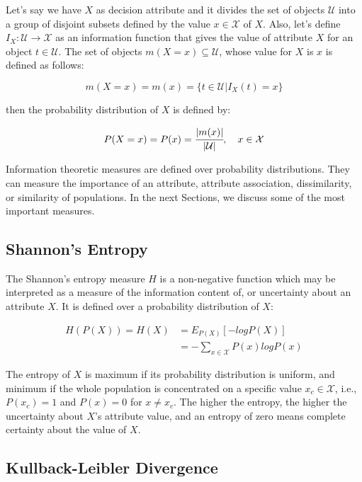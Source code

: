 Let's say we have $X$ as decision attribute and it divides the set of objects $\mathcal{U}$ into a group of disjoint
subsets defined by the value $x \in \mathcal{X}$ of $X$. Also, let's define $I_X : \mathcal{U} \rightarrow \mathcal{X}$
as an information function that gives the value of
attribute $X$ for an object $t \in \mathcal{U}$. The set of objects $m(X=x) \subseteq \mathcal{U}$, whose value for
$X$
is $x$ is defined as follows:

\begin{equation}
 m(X=x)=m(x)=\{t \in \mathcal{U} | I_X(t)=x\}
\end{equation}

then the probability distribution of $X$ is defined by:

\begin{equation}
 P(X=x)=P(x)=\cfrac{|m(x)|}{|\mathcal{U}|},\quad x \in \mathcal{X}
\end{equation}

Information theoretic measures are defined over probability distributions. They can measure the importance of an
attribute, attribute association, dissimilarity, or similarity of populations. In the next Sections, we discuss some of
the most important measures.

\subsection{Shannon's Entropy}

The Shannon's entropy measure $H$ is a non-negative function which may be interpreted as a measure of the information
content of, or uncertainty about an attribute $X$. It is defined over a probability distribution of $X$:

\begin{equation}
\begin{split}
 H(P(X))=H(X)&=E_{P(X)}[-logP(X)] \\
 &=-\sum_{x \in \mathcal{X}}P(x)logP(x)
\end{split} 
\end{equation}

The entropy of $X$ is maximum if its probability distribution is uniform, and minimum if the whole population is
concentrated on a specific value $x_c \in \mathcal{X}$, i.e., $P(x_c)=1$ and $P(x)=0$ for $x \neq x_c$. The higher the
entropy, the higher the uncertainty about $X$'s attribute value, and an entropy of zero means complete certainty about
the value of $X$.

\subsection{Kullback-Leibler Divergence}
\label{sec:kldiv}

